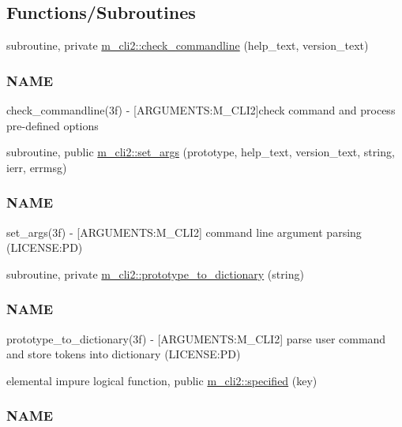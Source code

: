 \subsection*{Functions/\+Subroutines}
\begin{DoxyCompactItemize}
\item 
subroutine, private \mbox{\hyperlink{namespacem__cli2_ada8b5e7a86778085f55821ec31c5977a}{m\+\_\+cli2\+::check\+\_\+commandline}} (help\+\_\+text, version\+\_\+text)
\begin{DoxyCompactList}\small\item\em \subsubsection*{N\+A\+ME}

check\+\_\+commandline(3f) -\/ \mbox{[}A\+R\+G\+U\+M\+E\+N\+TS\+:M\+\_\+\+C\+L\+I2\mbox{]}check command and process pre-\/defined options \end{DoxyCompactList}\item 
subroutine, public \mbox{\hyperlink{namespacem__cli2_a54449bc83be4ddc46746a6a33b590c40}{m\+\_\+cli2\+::set\+\_\+args}} (prototype, help\+\_\+text, version\+\_\+text, string, ierr, errmsg)
\begin{DoxyCompactList}\small\item\em \subsubsection*{N\+A\+ME}

set\+\_\+args(3f) -\/ \mbox{[}A\+R\+G\+U\+M\+E\+N\+TS\+:M\+\_\+\+C\+L\+I2\mbox{]} command line argument parsing (L\+I\+C\+E\+N\+SE\+:PD) \end{DoxyCompactList}\item 
subroutine, private \mbox{\hyperlink{namespacem__cli2_a14896d00e509cbc32f4df993a8d6f75b}{m\+\_\+cli2\+::prototype\+\_\+to\+\_\+dictionary}} (string)
\begin{DoxyCompactList}\small\item\em \subsubsection*{N\+A\+ME}

prototype\+\_\+to\+\_\+dictionary(3f) -\/ \mbox{[}A\+R\+G\+U\+M\+E\+N\+TS\+:M\+\_\+\+C\+L\+I2\mbox{]} parse user command and store tokens into dictionary (L\+I\+C\+E\+N\+SE\+:PD) \end{DoxyCompactList}\item 
elemental impure logical function, public \mbox{\hyperlink{namespacem__cli2_a90118f308a5120041a5862fca4740367}{m\+\_\+cli2\+::specified}} (key)
\begin{DoxyCompactList}\small\item\em \subsubsection*{N\+A\+ME}


\end{DoxyCompactList}
\end{DoxyCompactItemize}
